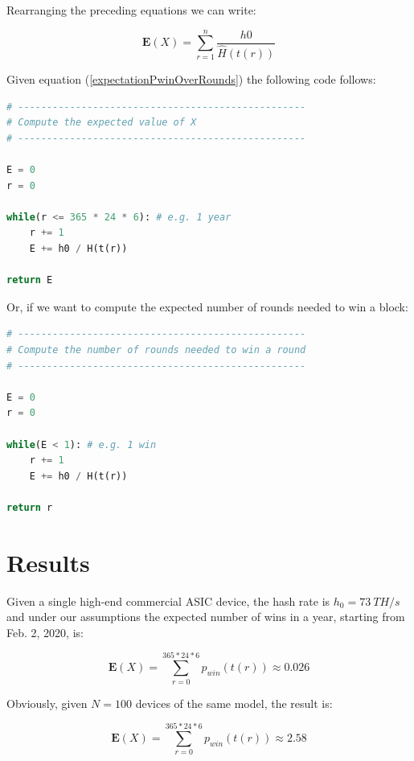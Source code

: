 \documentclass{book}
\theoremstyle{definition}
\begin{document}
Rearranging the preceding equations we can write:

\begin{equation}
    \mathbf{E}(X) = \displaystyle\sum_{r=1}^{n} \frac{h0}{\widehat{H}(t(r))} \label{expectationPwinOverRounds}
\end{equation}

Given equation (\ref{expectationPwinOverRounds}) the following code follows:

\begin{lstlisting}[language=Python]
# --------------------------------------------------
# Compute the expected value of X
# --------------------------------------------------

E = 0
r = 0

while(r <= 365 * 24 * 6): # e.g. 1 year
    r += 1
    E += h0 / H(t(r))

return E
\end{lstlisting}

Or, if we want to compute the expected number of rounds needed to win a block:

\begin{lstlisting}[language=Python]
# --------------------------------------------------
# Compute the number of rounds needed to win a round
# --------------------------------------------------

E = 0
r = 0

while(E < 1): # e.g. 1 win
    r += 1
    E += h0 / H(t(r))

return r
\end{lstlisting}

\section{Results}

Given a single high-end commercial ASIC device, the hash rate is $h_{0} = 73\ TH/s$ and under our assumptions
the expected number of wins in a year, starting from Feb. 2, 2020, is:

\begin{equation}
    \mathbf{E}(X) = \displaystyle\sum_{r=0}^{365*24*6} p_{win}(t(r)) \approx 0.026 \label{res1}
\end{equation}

Obviously, given $N=100$ devices of the same model, the result is:

\begin{equation}
    \mathbf{E}(X) = \displaystyle\sum_{r=0}^{365*24*6} p_{win}(t(r)) \approx 2.58 \label{res11}
\end{equation}
\end{document}
